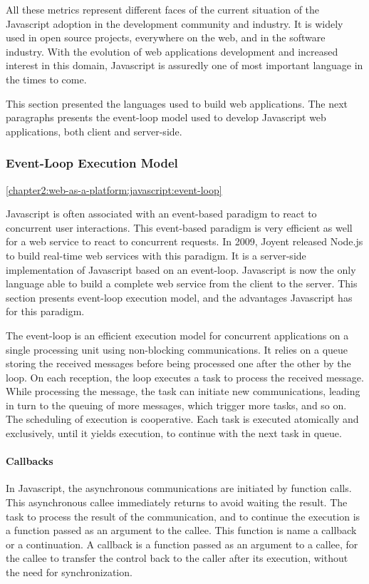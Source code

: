 All these metrics represent different faces of the current situation of the Javascript adoption in the development community and industry.
It is widely used in open source projects, everywhere on the web, and in the software industry.
With the evolution of web applications development and increased interest in this domain, Javascript is assuredly one of most important language in the times to come.

This section presented the languages used to build web applications.
The next paragraphs presents the event-loop model used to develop Javascript web applications, both client and server-side.

\subsubsection{Event-Loop Execution Model} \ref{chapter2:web-as-a-platform:javascript:event-loop}

Javascript is often associated with an event-based paradigm to react to concurrent user interactions.
This event-based paradigm is very efficient as well for a web service to react to concurrent requests.
In 2009, Joyent released Node.js to build real-time web services with this paradigm.
It is a server-side implementation of Javascript based on an event-loop.
Javascript is now the only language able to build a complete web service from the client to the server.
This section presents event-loop execution model, and the advantages Javascript has for this paradigm.

The event-loop is an efficient execution model for concurrent applications on a single processing unit using non-blocking communications.
It relies on a queue storing the received messages before being processed one after the other by the loop.
On each reception, the loop executes a task to process the received message.
While processing the message, the task can initiate new communications, leading in turn to the queuing of more messages, which trigger more tasks, and so on.
The scheduling of execution is cooperative.
Each task is executed atomically and exclusively, until it yields execution, to continue with the next task in queue.


\paragraph{Callbacks}

In Javascript, the asynchronous communications are initiated by function calls.
This asynchronous callee immediately returns to avoid waiting the result.
The task to process the result of the communication, and to continue the execution is a function passed as an argument to the callee.
This function is name a callback or a continuation.
A callback is a function passed as an argument to a callee, for the callee to transfer the control back to the caller after its execution, without the need for synchronization.


